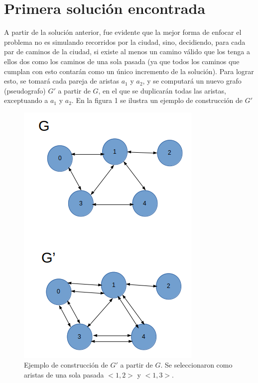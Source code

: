 \documentclass[a4paper,12pt,twocolumn]{article}
\begin{document}
\section{Primera solución encontrada}
	A partir de la solución anterior, fue evidente que la mejor forma de enfocar el problema no es simulando recorridos por la ciudad, sino, decidiendo, para cada par de caminos de la ciudad, si existe al menos un camino válido que los tenga a ellos dos como los caminos de una sola pasada (ya que todos los caminos que cumplan con esto contarán como un único incremento de la solución). Para lograr esto, se tomará cada pareja de aristas $a_1$ y $a_2$, y se computará un nuevo grafo (pseudografo) $G'$ a partir de $G$, en el que se duplicarán todas las aristas, exceptuando a $a_1$ y $a_2$. En la figura 1 se ilustra un ejemplo de construcción de $G'$\\
	\begin{figure}[h!]
		\centering
		\includegraphics[width=0.9\linewidth]{"Figura 1"}
		\caption{Ejemplo de construcción de $G'$ a partir de $G$. Se seleccionaron como aristas de una sola pasada $<1,2>$ y $<1,3>$.}
		\label{fig:figura-1}
	\end{figure}
	
\end{document}
